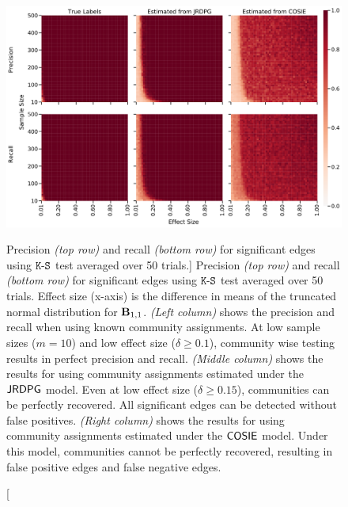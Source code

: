 \begin{figure}
    \centering
    \includegraphics[width=.9\textwidth]{figures/dnd/exp4_means_final.pdf}
    \caption
    [Precision \textit{(top row)} and recall \textit{(bottom row)} for significant edges using $\operatorname{\mathtt{K-S}}$ test averaged over 50 trials.]
    {Precision \textit{(top row)} and recall \textit{(bottom row)} for significant edges using $\operatorname{\mathtt{K-S}}$ test averaged over 50 trials. Effect size (x-axis) is the difference in means of the truncated normal distribution for $\operatorname{\mathbf{B}}_{1, 1}$.
    \textit{(Left column)} shows the precision and recall when using known community assignments. At low sample sizes ($m =10$) and low effect size ($\delta \geq 0.1$), community wise testing results in perfect precision and recall.
    \textit{(Middle column)} shows the results for using community assignments estimated under the $\operatorname{\mathsf{JRDPG}}$ model. Even at low effect size ($\delta \geq 0.15$), communities can be perfectly recovered. All significant edges can be detected without false positives. 
    \textit{(Right column)} shows the results for using community assignments estimated under the $\operatorname{\mathsf{COSIE}}$ model. Under this model, communities cannot be perfectly recovered, resulting in false positive edges and false negative edges.}
    \label{fig:exp4_means}
\end{figure}

